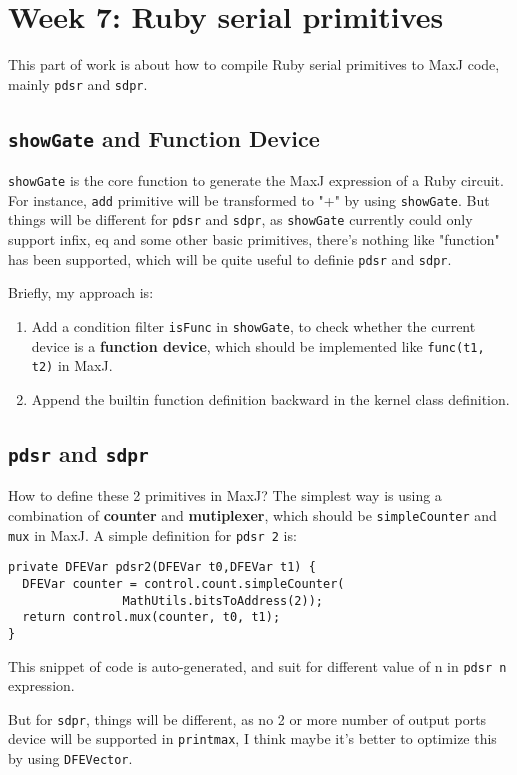 

\section{Week 7: Ruby serial primitives}

This part of work is about how to compile Ruby serial primitives to MaxJ code, mainly \texttt{pdsr} and \texttt{sdpr}. 

\subsection{\texttt{showGate} and Function Device}
\texttt{showGate} is the core function to generate the MaxJ expression of a Ruby circuit. For instance, \texttt{add} primitive will be transformed to "+" by using \texttt{showGate}. But things will be different for \texttt{pdsr} and \texttt{sdpr}, as \texttt{showGate} currently could only support infix, eq and some other basic primitives, there's nothing like "function" has been supported, which will be quite useful to definie \texttt{pdsr} and \texttt{sdpr}.

Briefly, my approach is:
\begin{enumerate}
\item Add a condition filter \texttt{isFunc} in \texttt{showGate}, to check whether the current device is a \textbf{function device}, which should be implemented like \texttt{func(t1, t2)} in MaxJ. 
\item Append the builtin function definition backward in the kernel class definition. 
\end{enumerate}

\subsection{\texttt{pdsr} and \texttt{sdpr}}
How to define these 2 primitives in MaxJ? The simplest way is using a combination of \textbf{counter} and \textbf{mutiplexer}, which should be \texttt{simpleCounter} and \texttt{mux} in MaxJ. A simple definition for \texttt{pdsr 2} is:

\begin{lstlisting}
private DFEVar pdsr2(DFEVar t0,DFEVar t1) {
  DFEVar counter = control.count.simpleCounter(
    			MathUtils.bitsToAddress(2));
  return control.mux(counter, t0, t1);
}
\end{lstlisting}

This snippet of code is auto-generated, and suit for different value of n in \texttt{pdsr n} expression.

But for \texttt{sdpr}, things will be different, as no 2 or more number of output ports device will be supported in \texttt{printmax}, I think maybe it's better to optimize this by using \texttt{DFEVector}.